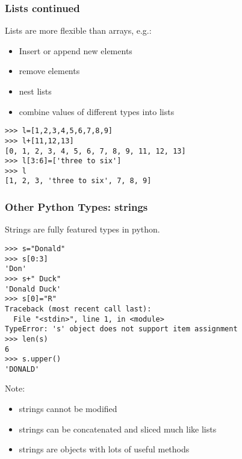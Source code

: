 \documentclass[10pt]{beamer}
\begin{document}
\begin{frame}[fragile]
\frametitle{Lists continued}

Lists are more flexible than arrays, e.g.:
\begin{itemize}
\item Insert or append new elements
\item remove elements
\item nest lists
\item combine values of different types into lists
\end{itemize}

\begin{verbatim}
>>> l=[1,2,3,4,5,6,7,8,9]
>>> l+[11,12,13]
[0, 1, 2, 3, 4, 5, 6, 7, 8, 9, 11, 12, 13]
>>> l[3:6]=['three to six']
>>> l
[1, 2, 3, 'three to six', 7, 8, 9]
\end{verbatim}

\end{frame}

\begin{frame}[fragile]
\frametitle{Other Python Types: strings}

Strings are fully featured types in python.

\begin{verbatim}
>>> s="Donald"
>>> s[0:3]
'Don'
>>> s+" Duck"
'Donald Duck'
>>> s[0]="R"
Traceback (most recent call last):
  File "<stdin>", line 1, in <module>
TypeError: 's' object does not support item assignment
>>> len(s)
6
>>> s.upper()
'DONALD'
\end{verbatim}

Note:
\begin{itemize}
\item strings cannot be modified
\item strings can be concatenated and sliced much like lists
\item strings are objects with lots of useful methods
\end{itemize}

\end{frame}
\end{document}
